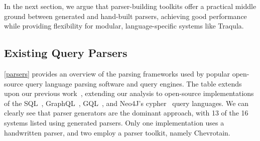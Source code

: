 \documentclass[runningheads]{llncs}
\begin{document}
    In the next section, we argue that parser-building toolkits offer a practical middle ground between generated and hand-built parsers,
    achieving good performance
    while providing flexibility for modular, language-specific systems like Traqula.

    \subsection{Existing Query Parsers}

    \autoref{parsers} provides an overview of the parsing frameworks used by popular open-source query language parsing software and query engines.
    The table extends upon our previous work~\cite{modular-parsing}, extending our analysis to open-source implementations of the
    SQL~\cite{iso-sql}, GraphQL~\cite{spec:graphql}, GQL~\cite{iso-gql}, and Neo4J's cypher~\cite{neo4j} query languages.
    We can clearly see that parser generators are the dominant approach, with 13 of the 16 systems listed using generated parsers.
    Only one implementation uses a handwritten parser, and two employ a parser toolkit, namely Chevrotain.
\end{document}
